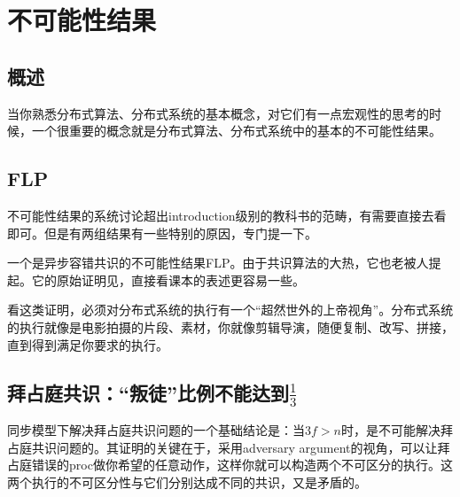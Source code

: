 \chapter{不可能性结果}

\section{概述}

当你熟悉分布式算法、分布式系统的基本概念，对它们有一点宏观性的思考的时候，一个很重要的概念就是分布式算法、分布式系统中的基本的不可能性结果。


\section{FLP}

不可能性结果的系统讨论超出introduction级别的教科书的范畴，有需要直接去看\cite{Attiya14}即可。但是有两组结果有一些特别的原因，专门提一下。

一个是异步容错共识的不可能性结果FLP。由于共识算法的大热，它也老被人提起。它的原始证明见\cite{Fischer85}，直接看课本的表述更容易一些\cite{Attiya14}。

看这类证明，必须对分布式系统的执行有一个“超然世外的上帝视角”。分布式系统的执行就像是电影拍摄的片段、素材，你就像剪辑导演，随便复制、改写、拼接，直到得到满足你要求的执行。

\section{拜占庭共识：“叛徒”比例不能达到$\frac{1}{3}$}

同步模型下解决拜占庭共识问题的一个基础结论是：当$3f>n$时，是不可能解决拜占庭共识问题的。其证明的关键在于，采用adversary argument的视角，可以让拜占庭错误的proc做你希望的任意动作，这样你就可以构造两个不可区分的执行。这两个执行的不可区分性与它们分别达成不同的共识，又是矛盾的。

